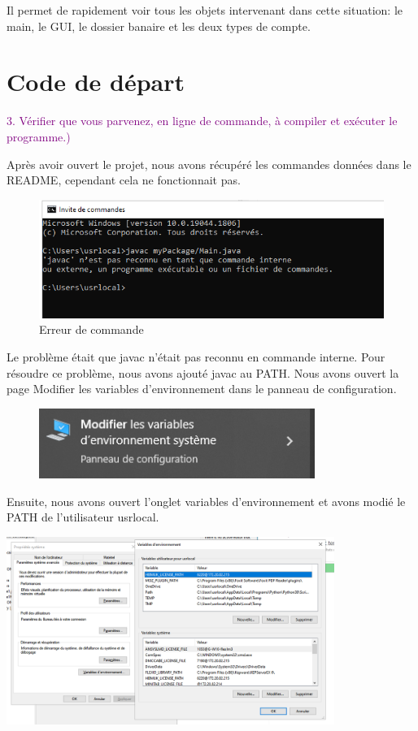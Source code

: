 \documentclass{article}
\begin{document}
Il permet de rapidement voir tous les objets intervenant dans cette situation: le main, le GUI, le dossier banaire et les deux types de compte.


\newpage
\section{Code de départ}


\textcolor{Purple}{3. Vérifier que vous parvenez, en ligne de commande, à compiler et exécuter le programme.)}
\newline



Après avoir ouvert le projet, nous avons récupéré les commandes données dans le README, cependant cela ne fonctionnait pas.
\newline

\begin{figure}[h]

\includegraphics[width=1\textwidth]{erreurjavac.png}
\caption{Erreur de commande}
\end{figure}

 Le problème était que javac n'était pas reconnu en commande interne. Pour résoudre ce problème, nous avons ajouté javac au PATH.
 Nous avons ouvert la page Modifier les variables d'environnement dans le panneau de configuration.

\begin{figure}[h]
\includegraphics[width=0.8\textwidth]{Annotation 2023-01-10 143053.png}
\end{figure}

Ensuite, nous avons ouvert l'onglet variables d'environnement et avons modié le PATH de l'utilisateur usrlocal.

\includegraphics[width=0.8\textwidth]{Annotation 2023-01-10 143100.png}
\end{document}
